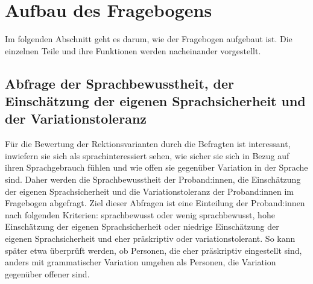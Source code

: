 \section{Aufbau des Fragebogens}
\label{sec:Fragebogen}
Im folgenden Abschnitt geht es darum, wie der Fragebogen aufgebaut ist. Die einzelnen Teile und ihre Funktionen werden nacheinander vorgestellt. 
\subsection{Abfrage der Sprachbewusstheit, der Einschätzung der eigenen Sprachsicherheit und der Variationstoleranz}
\label{sec:RE}
\largerpage
Für die Bewertung der Rektionsvarianten durch die Befragten ist interessant, inwiefern sie sich als sprachinteressiert sehen, wie sicher sie sich in Bezug auf ihren Sprachgebrauch fühlen und wie offen sie gegenüber Variation in der Sprache sind. 
Daher werden die Sprachbewusstheit der Proband:innen, die Einschätzung der eigenen Sprachsicherheit und die Variationstoleranz der Proband:innen im Fragebogen abgefragt. 
Ziel dieser Abfragen ist eine Einteilung der Proband:innen nach folgenden Kriterien: sprachbewusst oder wenig sprachbewusst, hohe Einschätzung der eigenen Sprachsicherheit oder niedrige Einschätzung der eigenen Sprachsicherheit und eher präskriptiv oder variationstolerant. 
So kann später etwa überprüft werden, ob Personen, die eher präskriptiv eingestellt sind, anders mit grammatischer Variation umgehen als Personen, die Variation gegenüber offener sind. 

